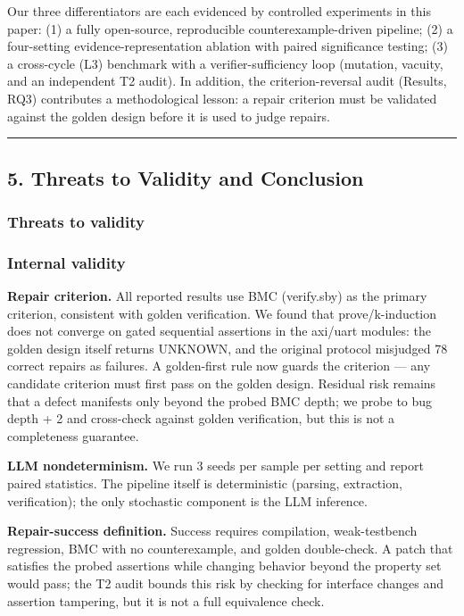 \documentclass[
  11pt,
]{article}
\begin{document}
Our three differentiators are each evidenced by controlled experiments in this paper: (1) a fully open-source, reproducible counterexample-driven pipeline; (2) a four-setting evidence-representation ablation with paired significance testing; (3) a cross-cycle (L3) benchmark with a verifier-sufficiency loop (mutation, vacuity, and an independent T2 audit). In addition, the criterion-reversal audit (Results, RQ3) contributes a methodological lesson: a repair criterion must be validated against the golden design before it is used to judge repairs.

\begin{center}\rule{0.5\linewidth}{0.5pt}\end{center}

\subsection{5. Threats to Validity and Conclusion}\label{threats-to-validity-and-conclusion}

\subsubsection{Threats to validity}\label{threats-to-validity}

\subsubsection{Internal validity}\label{internal-validity}

\textbf{Repair criterion.} All reported results use BMC (verify.sby) as the primary criterion, consistent with golden verification. We found that prove/k-induction does not converge on gated sequential assertions in the axi/uart modules: the golden design itself returns UNKNOWN, and the original protocol misjudged 78 correct repairs as failures. A golden-first rule now guards the criterion --- any candidate criterion must first pass on the golden design. Residual risk remains that a defect manifests only beyond the probed BMC depth; we probe to bug depth + 2 and cross-check against golden verification, but this is not a completeness guarantee.

\textbf{LLM nondeterminism.} We run 3 seeds per sample per setting and report paired statistics. The pipeline itself is deterministic (parsing, extraction, verification); the only stochastic component is the LLM inference.

\textbf{Repair-success definition.} Success requires compilation, weak-testbench regression, BMC with no counterexample, and golden double-check. A patch that satisfies the probed assertions while changing behavior beyond the property set would pass; the T2 audit bounds this risk by checking for interface changes and assertion tampering, but it is not a full equivalence check.
\end{document}
